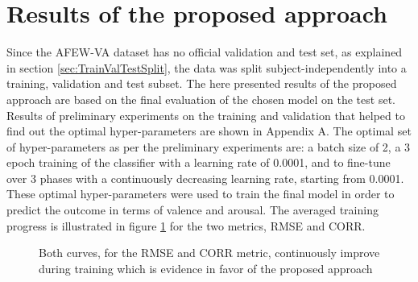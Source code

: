 \section{Results of the proposed approach}
Since the AFEW-VA dataset has no official validation and test set, as explained in section \ref{sec:TrainValTestSplit}, the data was split subject-independently into a training, validation and test subset. The here presented results of the proposed approach are based on the final evaluation of the chosen model on the test set. Results of preliminary experiments on the training and validation that helped to find out the optimal hyper-parameters are shown in Appendix A.
\newline\newline
The optimal set of hyper-parameters as per the preliminary experiments are: a batch size of 2, a 3 epoch training of the classifier with a learning rate of 0.0001, and to fine-tune over 3 phases with a continuously decreasing learning rate, starting from 0.0001. These optimal hyper-parameters were used to train the final model in order to predict the outcome in terms of valence and arousal. The averaged training progress is illustrated in figure \ref{fig:LearningCurveResults} for the two metrics, RMSE and CORR.

\begin{figure}[H]
  \centering
  \hfill
  \caption{Both curves, for the RMSE and CORR metric, continuously improve during training which is evidence in favor of the proposed approach}
  \label{fig:LearningCurveResults}
\end{figure}

